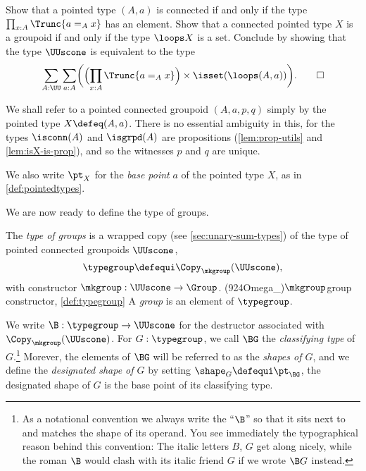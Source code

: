 \begin{xca}\label{xca:defgroup}
  Show that a pointed type $(A,a)$ is connected if and only if the type $\prod_{x:A}\Trunc{a =_A x}$ has an element.
  Show that a connected pointed type $X$ is a groupoid if and only if the type $\loops X$ is a set.
  Conclude by showing that the type $\UUscone$ is equivalent to the type
  \[
    \sum_{A:\UU} \sum_{a:A} \biggl( \Bigl( \prod_{x:A}\Trunc{a =_A x} \Bigr)
      \times \isset( \loops (A,a) ) \biggr).\qedhere
  \]
\end{xca}

\begin{remark}
  We shall refer to a pointed connected groupoid $(A,a,p,q)$ simply
  by the pointed type $X \defeq (A,a)$.
  There is no essential ambiguity in this, for
  the types $\isconn(A)$ and $\isgrpd(A)$ are propositions (\cref{lem:prop-utils} and \cref{lem:isX-is-prop}),
  and so the witnesses $p$ and $q$ are unique.

  We also write $\pt_X$ for the \emph{base point} $a$ of the pointed type $X$, as in \cref{def:pointedtypes}.
\end{remark}

We are now ready to define the type of groups.

\begin{definition}\label{def:typegroup}
  The \emph{type of groups} is a wrapped copy (see \cref{sec:unary-sum-types})
  of the type of pointed connected groupoids $\UUscone$,
  \[
    \typegroup \defequi \Copy_{\mkgroup}(\UUscone),
  \]
  with constructor $\mkgroup : \UUscone \to \Group$.%
  \glossary(924Omega_){$\protect\mkgroup$}{group constructor, \cref{def:typegroup}}
  A \emph{group} is an element of $\typegroup$.
\end{definition}

\begin{definition}\label{def:classifying-type}
  We write $\B : \typegroup \to \UUscone$ for the
  destructor associated with $\Copy_{\mkgroup}(\UUscone)$.
  For $G : \typegroup$,
  we call $\BG$ the \emph{classifying type} of $G$.\footnote{%
    As a notational convention we always write the ``$\B$''
    so that it sits next to and matches the shape
    of its operand.
    You see immediately the typographical reason behind this convention:
    The italic letters $B$, $G$ get along nicely,
    while the roman $\B$ would clash with its italic friend $G$
    if we wrote $\B G$ instead.}
  Morever, the elements of $\BG$ will be referred to as the \emph{shapes of $G$},
  and we define the \emph{designated shape of $G$} by setting
  $\shape_G\defequi \pt_{\BG}$,
  \ie the designated shape of $G$ is the base point of its
  classifying type.
\end{definition}

